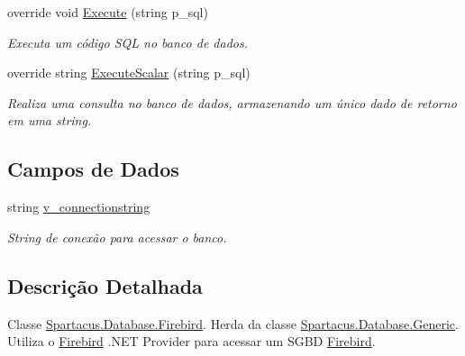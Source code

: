 \begin{DoxyCompactItemize}
override void \hyperlink{classSpartacus_1_1Database_1_1Firebird_a1844a94a27db40450a91a1d415a9d456}{Execute} (string p\+\_\+sql)
\begin{DoxyCompactList}\small\item\em Executa um código S\+Q\+L no banco de dados. \end{DoxyCompactList}\item 
override string \hyperlink{classSpartacus_1_1Database_1_1Firebird_ab785abbc3e5f8b989c10c3a771981a83}{Execute\+Scalar} (string p\+\_\+sql)
\begin{DoxyCompactList}\small\item\em Realiza uma consulta no banco de dados, armazenando um único dado de retorno em uma string. \end{DoxyCompactList}\end{DoxyCompactItemize}
\subsection*{Campos de Dados}
\begin{DoxyCompactItemize}
\item 
string \hyperlink{classSpartacus_1_1Database_1_1Firebird_afb3d04d42e84e18c12d75bed71fb0b45}{v\+\_\+connectionstring}
\begin{DoxyCompactList}\small\item\em String de conexão para acessar o banco. \end{DoxyCompactList}\end{DoxyCompactItemize}


\subsection{Descrição Detalhada}
Classe \hyperlink{classSpartacus_1_1Database_1_1Firebird}{Spartacus.\+Database.\+Firebird}. Herda da classe \hyperlink{classSpartacus_1_1Database_1_1Generic}{Spartacus.\+Database.\+Generic}. Utiliza o \hyperlink{classSpartacus_1_1Database_1_1Firebird}{Firebird} .N\+E\+T Provider para acessar um S\+G\+B\+D \hyperlink{classSpartacus_1_1Database_1_1Firebird}{Firebird}. 



